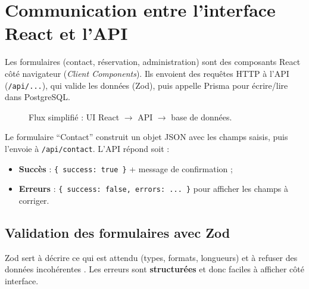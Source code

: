 \section{Communication entre l’interface React et l’API}
Les formulaires (contact, réservation, administration) sont des composants React côté navigateur (\textit{Client Components}). Ils envoient des requêtes HTTP à l’API (\texttt{/api/...}), qui valide les données (Zod), puis appelle Prisma pour écrire/lire dans PostgreSQL.

\begin{figure}[H]
    \centering
    \caption{Flux simplifié : UI React $\rightarrow$ API $\rightarrow$ base de données.}
    \label{fig:react_api_flow}
\end{figure}
Le formulaire “Contact” construit un objet JSON avec les champs saisis, puis l’envoie à \texttt{/api/contact}. L’API répond soit :
\begin{itemize}
    \item \textbf{Succès} : \texttt{\{ success: true \}} + message de confirmation ;
    \item \textbf{Erreurs} : \texttt{\{ success: false, errors: ... \}} pour afficher les champs à corriger.
\end{itemize}

\subsection{Validation des formulaires avec Zod}
Zod sert à décrire ce qui est attendu (types, formats, longueurs) et à refuser des données incohérentes \cite{zodDocs}. Les erreurs sont \textbf{structurées} et donc faciles à afficher côté interface.

